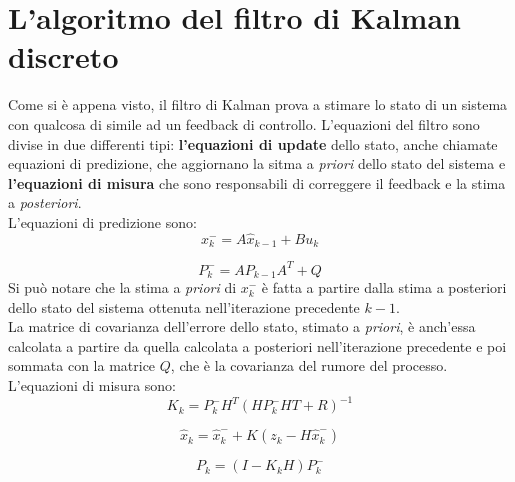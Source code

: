 \section{L'algoritmo del filtro di Kalman discreto}

Come si è appena visto, il filtro di Kalman prova a stimare lo stato di un sistema con qualcosa di simile ad un feedback di controllo. L'equazioni del filtro sono divise in due differenti tipi: \textbf{l'equazioni di update} dello stato, anche chiamate equazioni di predizione, che aggiornano la sitma a \textit{priori} dello stato del sistema e \textbf{l'equazioni di misura} che sono responsabili di correggere il feedback e la stima a \textit{posteriori}.\\
L'equazioni di predizione sono:
\begin{equation}
\label{eq:xkc}
x_k^- = A\hat{x}_{k-1} + B u_k
\end{equation}

\begin{equation}
\label{eq:pkc}
P_k^- = AP_{k-1}A^T + Q
\end{equation}
Si può notare che la stima a \textit{priori} di $x_k^-$ è fatta a partire dalla stima a posteriori dello stato del sistema ottenuta nell'iterazione precedente $k-1$.\\
La matrice di covarianza dell'errore dello stato, stimato a \textit{priori}, è anch'essa calcolata a partire da quella calcolata a posteriori nell'iterazione precedente e poi sommata con la matrice $Q$, che è la covarianza del rumore del processo.
L'equazioni di misura sono:
\begin{equation}
\label{eq:kk}
K_k = P_k^-H^T (HP_k^- HT + R)^{-1}
\end{equation}

\begin{equation}
\label{eq:xk}
\hat{x}_k = \hat{x}_k^- + K(z_k - H\hat{x}_k^-)
\end{equation}

\begin{equation}
\label{eq:pk}
P_k = (I - K_k H) P_k^-
\end{equation}

